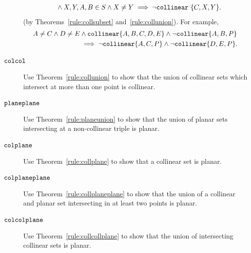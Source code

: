 \begin{description}
\begin{align*}
  &\qquad\wedge X,Y,A,B \in S \wedge X \neq Y\implies \neg\texttt{collinear}\ \{C,X,Y\}.
\end{align*} (by Theorems~\ref{rule:collsubset} and~\ref{rule:collunion}). For example,
\begin{align*}
A \neq C \wedge D \neq E &\wedge \texttt{collinear} \{A, B, C, D, E\} \wedge \neg\texttt{collinear} \{A, B, P\}\\
&\implies \neg\texttt{collinear} \{A, C, P\} \wedge \neg\texttt{collinear} \{D, E, P\}.
\end{align*}
\item[$\texttt{colcol}$] Use Theorem~\ref{rule:collunion} to show that the union of collinear sets which intersect at more than one point is collinear.
\item[$\texttt{planeplane}$] Use Theorem~\ref{rule:planeunion} to show that the union of planar sets intersecting at a non-collinear triple is planar.
\item[$\texttt{colplane}$] Use Theorem~\ref{rule:collplane} to show that a collinear set is planar.
\item[$\texttt{colplaneplane}$] Use Theorem~\ref{rule:collplaneplane} to show that the union of a collinear and planar set intersecting in at least two points is planar.
\item[$\texttt{colcolplane}$] Use Theorem~\ref{rule:collcollplane} to show that the union of intersecting collinear sets is planar.
\end{description}



